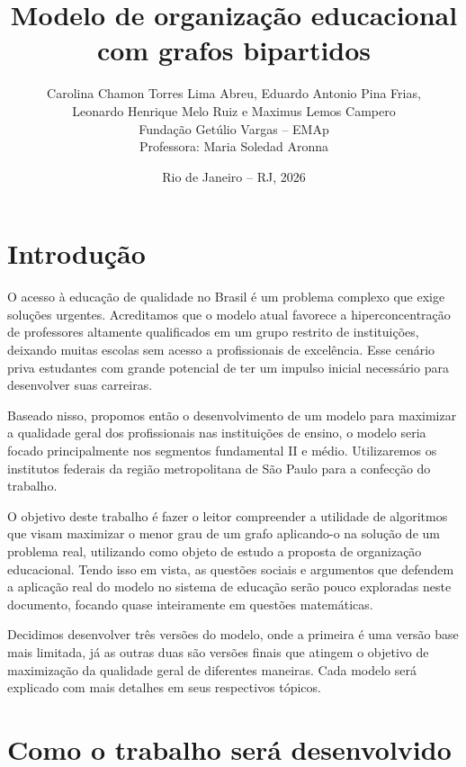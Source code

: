\documentclass[12pt,a4paper]{article}
\begin{document}
\title{Modelo de organização educacional com grafos bipartidos}
\author{
  Carolina Chamon Torres Lima Abreu, Eduardo Antonio Pina Frias, \\
  Leonardo Henrique Melo Ruiz e Maximus Lemos Campero \\
  \small Fundação Getúlio Vargas -- EMAp \\
  \small Professora: Maria Soledad Aronna
}
\date{Rio de Janeiro -- RJ, 2026}

\maketitle

\section{Introdução}

O acesso à educação de qualidade no Brasil é um problema complexo que exige
soluções urgentes. Acreditamos que o modelo atual favorece a hiperconcentração
de professores altamente qualificados em um grupo restrito de instituições,
deixando muitas escolas sem acesso a profissionais de excelência. Esse cenário
priva estudantes com grande potencial de ter um impulso inicial necessário para
desenvolver suas carreiras.

Baseado nisso, propomos então o desenvolvimento de um modelo para maximizar a
qualidade geral dos profissionais nas instituições de ensino, o modelo seria
focado principalmente nos segmentos fundamental II e médio. Utilizaremos os
institutos federais da região metropolitana de São Paulo para a confecção do
trabalho.

O objetivo deste trabalho é fazer o leitor compreender a utilidade de algoritmos
que visam maximizar o menor grau de um grafo aplicando-o na solução de um
problema real, utilizando como objeto de estudo a proposta de organização
educacional. Tendo isso em vista, as questões sociais e argumentos que defendem
a aplicação real do modelo no sistema de educação serão pouco exploradas neste
documento, focando quase inteiramente em questões matemáticas.

Decidimos desenvolver três versões do modelo, onde a primeira é uma versão base
mais limitada, já as outras duas são versões finais que atingem o objetivo de
maximização da qualidade geral de diferentes maneiras. Cada modelo será
explicado com mais detalhes em seus respectivos tópicos.

\section{Como o trabalho será desenvolvido}
\end{document}
